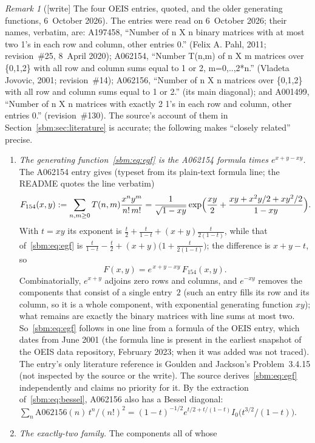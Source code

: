 \documentclass[11pt,letterpaper]{article}
\numberwithin{equation}{section}
\theoremstyle{remark}\newtheorem{remark}[theorem]{Remark}
\begin{document}
\begin{remark}[{[write]} The four OEIS entries, quoted, and the older generating functions, 6~October 2026]\label{sbm:rem:oeis}
The entries were read on 6~October 2026; their names, verbatim, are:
A197458, ``Number of n X n binary matrices with at most two 1's in each row
and column, other entries 0.'' (Felix A. Pahl, 2011; revision~\#25,
8~April 2020); A062154, ``Number T(n,m) of n X m matrices over \{0,1,2\}
with all row and column sums equal to 1 or 2, m=0,..,2*n.'' (Vladeta
Jovovic, 2001; revision~\#14); A062156, ``Number of n X n matrices over
\{0,1,2\} with all row and column sums equal to 1 or 2.'' (its main
diagonal); and A001499, ``Number of n X n matrices with exactly 2 1's in
each row and column, other entries 0.'' (revision~\#130). The source's
account of them in Section~\ref{sbm:sec:literature} is accurate; the
following makes ``closely related'' precise.
\begin{enumerate}
\item[(a)] \emph{The generating function~\eqref{sbm:eq:egf} is the A062154
 formula times $e^{x+y-xy}$.} The A062154 entry gives (typeset from its
 plain-text formula line; the README quotes the line verbatim)
 \[
  F_{154}(x,y):=\sum_{n,m\ge0}T(n,m)\frac{x^ny^m}{n!\,m!}
  =\frac1{\sqrt{1-xy}}\exp\Bigl(\frac{xy}2+\frac{xy+x^2y/2+xy^2/2}{1-xy}\Bigr).
 \]
 With $t=xy$ its exponent is $\frac t2+\frac t{1-t}+(x+y)\frac t{2(1-t)}$,
 while that of~\eqref{sbm:eq:egf} is
 $\frac t{1-t}-\frac t2+(x+y)\bigl(1+\frac t{2(1-t)}\bigr)$; the difference
 is $x+y-t$, so
 \[
  F(x,y)=e^{\,x+y-xy}\,F_{154}(x,y).
 \]
 Combinatorially, $e^{x+y}$ adjoins zero rows and columns, and $e^{-xy}$
 removes the components that consist of a single entry~$2$ (such an entry
 fills its row and its column, so it is a whole component, with exponential
 generating function $xy$); what remains are exactly the binary matrices with
 line sums at most two. So~\eqref{sbm:eq:egf} follows in one line from a
 formula of the OEIS entry, which dates from June 2001 (the formula line is
 present in the earliest snapshot of the OEIS data repository, February
 2023; when it was added was not traced). The entry's only literature
 reference is Goulden and Jackson's Problem~3.4.15 (not inspected by the
 source or the write). The
 source derives~\eqref{sbm:eq:egf} independently and claims no priority for
 it. By the extraction of~\eqref{sbm:eq:bessel}, A062156 also has a Bessel
 diagonal:
 $\sum_n\mathrm{A062156}(n)\,t^n/(n!)^2
 =(1-t)^{-1/2}e^{t/2+t/(1-t)}I_0\bigl(t^{3/2}/(1-t)\bigr)$.
\item[(b)] \emph{The exactly-two family.} The components all of whose

\end{enumerate}
\end{remark}
\end{document}
